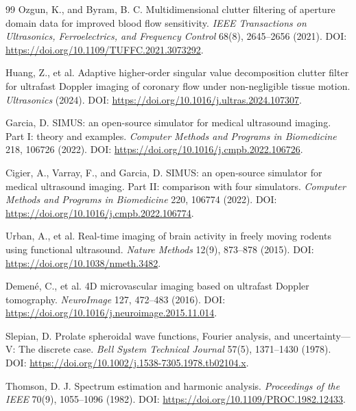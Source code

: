 \documentclass[11pt]{article}
\begin{document}
\begin{thebibliography}{99}
Ozgun, K., and Byram, B. C.
\newblock Multidimensional clutter filtering of aperture domain data for improved blood flow sensitivity.
\newblock \emph{IEEE Transactions on Ultrasonics, Ferroelectrics, and Frequency Control} 68(8), 2645--2656 (2021).
\newblock DOI: \url{https://doi.org/10.1109/TUFFC.2021.3073292}.

Huang, Z., et al.
\newblock Adaptive higher-order singular value decomposition clutter filter for ultrafast Doppler imaging of coronary flow under non-negligible tissue motion.
\newblock \emph{Ultrasonics} (2024).
\newblock DOI: \url{https://doi.org/10.1016/j.ultras.2024.107307}.

Garcia, D.
\newblock SIMUS: an open-source simulator for medical ultrasound imaging. Part I: theory and examples.
\newblock \emph{Computer Methods and Programs in Biomedicine} 218, 106726 (2022).
\newblock DOI: \url{https://doi.org/10.1016/j.cmpb.2022.106726}.

Cigier, A., Varray, F., and Garcia, D.
\newblock SIMUS: an open-source simulator for medical ultrasound imaging. Part II: comparison with four simulators.
\newblock \emph{Computer Methods and Programs in Biomedicine} 220, 106774 (2022).
\newblock DOI: \url{https://doi.org/10.1016/j.cmpb.2022.106774}.

Urban, A., et al.
\newblock Real-time imaging of brain activity in freely moving rodents using functional ultrasound.
\newblock \emph{Nature Methods} 12(9), 873--878 (2015).
\newblock DOI: \url{https://doi.org/10.1038/nmeth.3482}.

Demen{\'e}, C., et al.
\newblock 4D microvascular imaging based on ultrafast Doppler tomography.
\newblock \emph{NeuroImage} 127, 472--483 (2016).
\newblock DOI: \url{https://doi.org/10.1016/j.neuroimage.2015.11.014}.

Slepian, D.
\newblock Prolate spheroidal wave functions, Fourier analysis, and uncertainty---V: The discrete case.
\newblock \emph{Bell System Technical Journal} 57(5), 1371--1430 (1978).
\newblock DOI: \url{https://doi.org/10.1002/j.1538-7305.1978.tb02104.x}.

Thomson, D. J.
\newblock Spectrum estimation and harmonic analysis.
\newblock \emph{Proceedings of the IEEE} 70(9), 1055--1096 (1982).
\newblock DOI: \url{https://doi.org/10.1109/PROC.1982.12433}.


\end{thebibliography}
\end{document}
